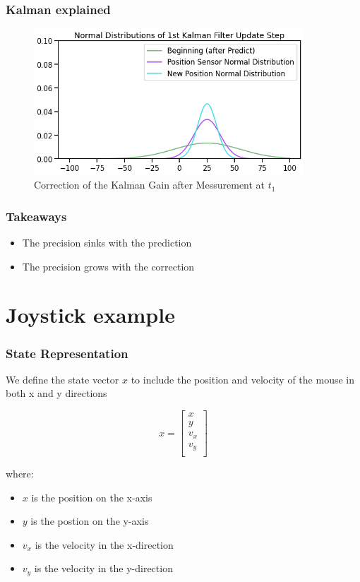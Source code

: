 \documentclass{beamer}
\begin{document}
\begin{frame}
    \frametitle{Kalman explained}
    \begin{figure}
        \centering
        \includegraphics[width=0.9\textwidth]{images/05_correction.png}
        \caption{Correction of the Kalman Gain after Messurement at \(t_1\)}
    \end{figure}
\end{frame}

\begin{frame}
    \frametitle{Takeaways}
    \begin{itemize}
        \item The precision sinks with the prediction
        \item The precision grows with the correction
    \end{itemize}
    
\end{frame}

\section{Joystick example}

\begin{frame}
    \frametitle{State Representation}
    We define the state vector \(x\) to include the position and velocity of the mouse in both x and y directions
   
    \begin{equation*}
        x = \begin{bmatrix}
            x      \\
            y      \\
            v_{x}  \\
            v_{y}  \\
        \end{bmatrix}
    \end{equation*}

    where:
    \begin{itemize}
        \item \(x\) is the position on the x-axis
        \item \(y\) is the postion on the y-axis
        \item \(v_{x}\) is the velocity in the x-direction
        \item \(v_{y}\) is the velocity in the y-direction

    \end{itemize}
\end{frame}
\end{document}

